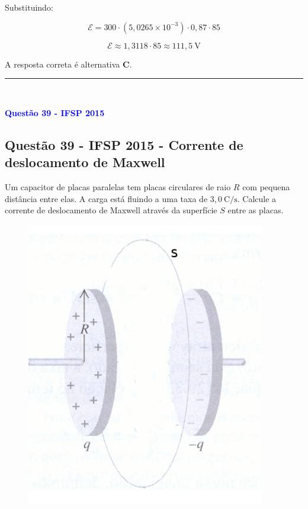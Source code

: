 \begin{flushleft}
Substituindo:

\[
\mathcal{E} = 300 \cdot (5{,}0265 \times 10^{-3}) \cdot 0{,}87 \cdot 85
\]

\[
\mathcal{E} \approx 1{,}3118 \cdot 85 \approx 111{,}5\ \text{V}
\]


A resposta correta é alternativa \colorbox{green!50}{\textbf{C}}.
\end{flushleft}

\noindent\rule{\linewidth}{0.6pt}\\

\begin{flushleft}
\textbf{\textcolor{blue}{\Large Quest\~ao 39 - IFSP 2015}}\\
\noindent

\subsection{Quest\~ao 39 - IFSP 2015 - Corrente de deslocamento de Maxwell}
Um capacitor de placas paralelas tem placas circulares de raio $R$ com pequena distância entre elas. 
A carga está fluindo a uma taxa de $3{,}0 \ \mathrm{C/s}$. Calcule a corrente de deslocamento de Maxwell através 
da superfície $S$ entre as placas.

\begin{figure}[!h]
\centering
\includegraphics[scale=0.5]{figures/capacitor.png}
\end{figure}    


\end{flushleft}
